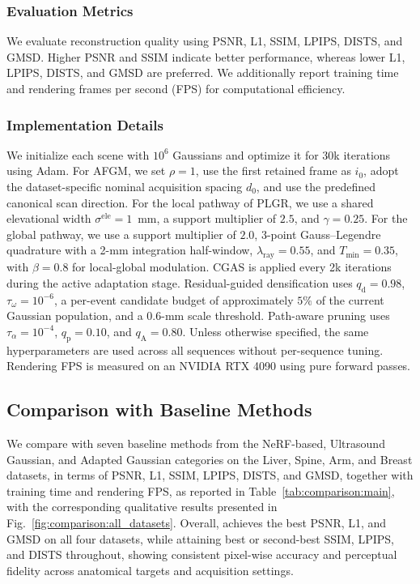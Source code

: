 \subsubsection{Evaluation Metrics}
\label{sec:experiments:metrics}

We evaluate reconstruction quality using PSNR, L1, SSIM, LPIPS, DISTS, and
GMSD. Higher PSNR and SSIM indicate better performance, whereas lower L1,
LPIPS, DISTS, and GMSD are preferred. We additionally report training time and
rendering frames per second (FPS) for computational efficiency.

\subsubsection{Implementation Details}
\label{sec:experiments:implementation}

We initialize each scene with $10^6$ Gaussians and optimize it for 30k
iterations using Adam. For AFGM, we set $\rho=1$, use the first retained frame
as $i_0$, adopt the dataset-specific nominal acquisition spacing $d_0$, and use
the predefined canonical scan direction. For the local pathway of PLGR, we use
a shared elevational width $\sigma^{\mathrm{ele}}=1$~mm, a support multiplier
of $2.5$, and $\gamma=0.25$. For the global pathway, we use a support
multiplier of $2.0$, 3-point Gauss--Legendre quadrature with a 2-mm integration
half-window, $\lambda_{\mathrm{ray}}=0.55$, and $T_{\min}=0.35$, with
$\beta=0.8$ for local-global modulation. CGAS is applied every 2k iterations
during the active adaptation stage. Residual-guided densification uses
$q_{\mathrm d}=0.98$, $\tau_{\omega}=10^{-6}$, a per-event candidate budget
of approximately $5\%$ of the current Gaussian population, and a $0.6$-mm
scale threshold. Path-aware pruning uses $\tau_{\alpha}=10^{-4}$,
$q_{\mathrm p}=0.10$, and $q_{\mathrm A}=0.80$. Unless otherwise specified,
the same hyperparameters are used across all sequences without per-sequence
tuning. Rendering FPS is measured on an NVIDIA RTX 4090 using pure forward
passes.



\vspace{-3mm}
\subsection{Comparison with Baseline Methods}
\label{sec:results:comparison}

We compare \methodname{} with seven baseline methods from the NeRF-based,
Ultrasound Gaussian, and Adapted Gaussian categories on the Liver, Spine, Arm,
and Breast datasets, in terms of PSNR, L1, SSIM, LPIPS, DISTS, and GMSD,
together with training time and rendering FPS, as reported in
Table~\ref{tab:comparison:main}, with the corresponding qualitative results
presented in Fig.~\ref{fig:comparison:all_datasets}.
Overall, \methodname{} achieves the best PSNR, L1, and GMSD on all four
datasets, while attaining best or second-best SSIM, LPIPS, and DISTS
throughout, showing consistent pixel-wise accuracy and perceptual fidelity
across anatomical targets and acquisition settings.

